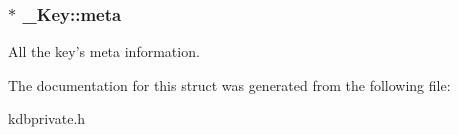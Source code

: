 \hypertarget{struct__Key_ad1596880712126bad997404b176872f5}{
\subsubsection[{meta}]{$\ast$ {\bf \_\-Key::meta}}}
\label{struct__Key_ad1596880712126bad997404b176872f5}
All the key's meta information. 

The documentation for this struct was generated from the following file:\begin{DoxyCompactItemize}
\item 
kdbprivate.h\end{DoxyCompactItemize}
